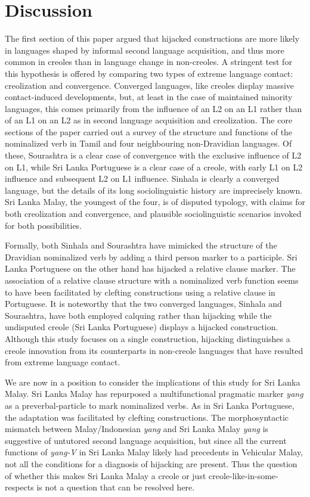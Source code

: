\section{Discussion}

The first section of this paper argued that hijacked constructions are more likely in languages shaped by informal second language acquisition, and thus more common in creoles than in language change in non-creoles. A stringent test for this hypothesis is offered by comparing two types of extreme language contact: creolization and convergence. Converged languages, like creoles display massive contact-induced developments, but, at least in the case of maintained minority languages, this comes primarily from the influence of an L2 on an L1 rather than of an L1 on an L2 as in second language acquisition and creolization. The core sections of the paper carried out a survey of the structure and functions of the nominalized verb in Tamil and four neighbouring non-Dravidian languages. Of these, Sourashtra is a clear case of convergence with the exclusive influence of L2 on L1, while Sri Lanka Portuguese is a clear case of a creole, with early L1 on L2 influence and subsequent L2 on L1 influence. Sinhala is clearly a converged language, but the details of its long sociolinguistic history are imprecisely known. Sri Lanka Malay, the youngest of the four, is of disputed typology, with claims for both creolization and convergence, and plausible sociolinguistic scenarios invoked for both possibilities. 

Formally, both Sinhala and Sourashtra have mimicked the structure of the Dravidian nominalized verb by adding a third person marker to a participle. Sri Lanka Portuguese on the other hand has hijacked a relative clause marker. The association of a relative clause structure with a nominalized verb function seems to have been facilitated by clefting constructions using a relative clause in Portuguese. It is noteworthy that the two converged languages, Sinhala and Sourashtra, have both employed calquing rather than hijacking while the undisputed creole (Sri Lanka Portuguese) displays a hijacked construction. Although this study focuses on a single construction, hijacking distinguishes a creole innovation from its counterparts in non-creole languages that have resulted from extreme language contact. 

We are now in a position to consider the implications of this study for Sri Lanka Malay. Sri Lanka Malay has repurposed a multifunctional pragmatic marker \textit{yang} as a preverbal-particle to mark nominalized verbs. As in Sri Lanka Portuguese, the adaptation was facilitated by clefting constructions. The morphosyntactic mismatch between Malay/Indonesian \textit{yang }and Sri Lanka Malay \textit{yang} is suggestive of untutored second language acquisition, but since all the current functions of \textit{yang-V} in Sri Lanka Malay likely had precedents in Vehicular Malay, not all the conditions for a diagnosis of hijacking are present. Thus the question of whether this makes Sri Lanka Malay a creole or just creole-like-in-some-respects is not a question that can be resolved here.

